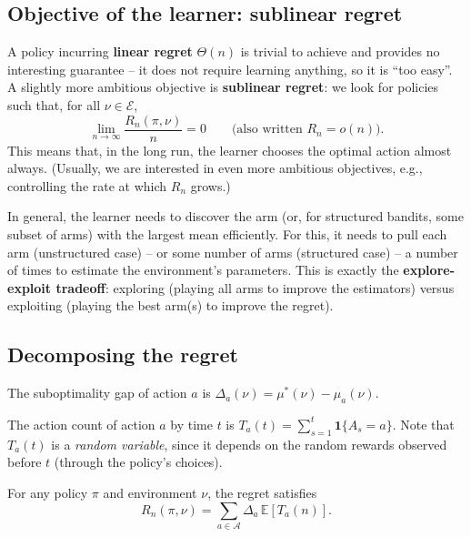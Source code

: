 \subsection{Objective of the learner: sublinear regret}

A policy incurring \textbf{linear regret} $\Theta(n)$ is trivial to achieve and provides no interesting guarantee -- it does not require learning anything, so it is ``too easy''. A slightly more ambitious objective is \textbf{sublinear regret}: we look for policies such that, for all $\nu \in \mathcal{E}$,
\[
\lim_{n \to \infty} \frac{R_n(\pi, \nu)}{n} = 0 \qquad \text{(also written } R_n = o(n)\text{)}.
\]
This means that, in the long run, the learner chooses the optimal action almost always. (Usually, we are interested in even more ambitious objectives, e.g., controlling the rate at which $R_n$ grows.)

In general, the learner needs to discover the arm (or, for structured bandits, some subset of arms) with the largest mean efficiently. For this, it needs to pull each arm (unstructured case) -- or some number of arms (structured case) -- a number of times to estimate the environment's parameters. This is exactly the \textbf{explore-exploit tradeoff}: exploring (playing all arms to improve the estimators) versus exploiting (playing the best arm(s) to improve the regret).

\subsection{Decomposing the regret}

\begin{definition}
The suboptimality gap of action $a$ is $\Delta_a(\nu) = \mu^*(\nu) - \mu_a(\nu)$.
\end{definition}

\begin{definition}
The action count of action $a$ by time $t$ is $T_a(t) = \sum_{s=1}^{t} \mathbf{1}\{A_s = a\}$. Note that $T_a(t)$ is a \emph{random variable}, since it depends on the random rewards observed before $t$ (through the policy's choices).
\end{definition}

\begin{lemma}
For any policy $\pi$ and environment $\nu$, the regret satisfies
\[
R_n(\pi, \nu) = \sum_{a \in \mathcal{A}} \Delta_a\, \mathbb{E}[T_a(n)].
\]
\end{lemma}


